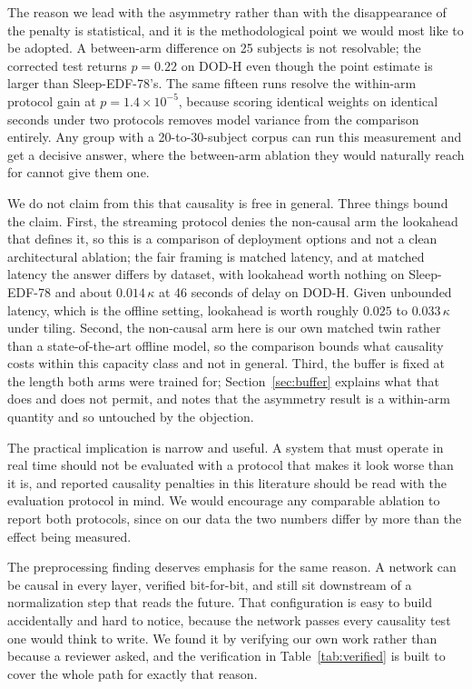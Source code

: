 \documentclass[conference]{IEEEtran}
\begin{document}
The reason we lead with the asymmetry rather than with the disappearance of the penalty is
statistical, and it is the methodological point we would most like to be adopted. A between-arm
difference on 25 subjects is not resolvable; the corrected test returns $p = 0.22$ on DOD-H even
though the point estimate is larger than Sleep-EDF-78's. The same fifteen runs resolve the
within-arm protocol gain at $p = 1.4\times10^{-5}$, because scoring identical weights on identical
seconds under two protocols removes model variance from the comparison entirely. Any group with a
20-to-30-subject corpus can run this measurement and get a decisive answer, where the between-arm
ablation they would naturally reach for cannot give them one.

We do not claim from this that causality is free in general. Three things bound the claim. First,
the streaming protocol denies the non-causal arm the lookahead that defines it, so this is a
comparison of deployment options and not a clean architectural ablation; the fair framing is matched
latency, and at matched latency the answer differs by dataset, with lookahead worth nothing on
Sleep-EDF-78 and about $0.014\,\kappa$ at 46 seconds of delay on DOD-H. Given unbounded latency,
which is the offline setting, lookahead is worth roughly $0.025$ to $0.033\,\kappa$ under tiling.
Second, the non-causal arm here is our own matched twin rather than a state-of-the-art offline
model, so the comparison bounds what causality costs within this capacity class and not in general.
Third, the buffer is fixed at the length both arms were trained for; Section~\ref{sec:buffer}
explains what that does and does not permit, and notes that the asymmetry result is a within-arm
quantity and so untouched by the objection.

The practical implication is narrow and useful. A system that must operate in real time should not
be evaluated with a protocol that makes it look worse than it is, and reported causality penalties
in this literature should be read with the evaluation protocol in mind. We would encourage any
comparable ablation to report both protocols, since on our data the two numbers differ by more than
the effect being measured.

The preprocessing finding deserves emphasis for the same reason. A network can be causal in every
layer, verified bit-for-bit, and still sit downstream of a normalization step that reads the future.
That configuration is easy to build accidentally and hard to notice, because the network passes
every causality test one would think to write. We found it by verifying our own work rather than
because a reviewer asked, and the verification in Table~\ref{tab:verified} is built to cover the
whole path for exactly that reason.
\end{document}
